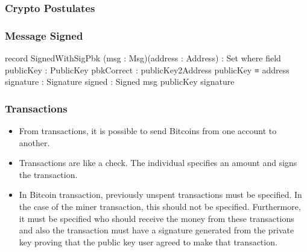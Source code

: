 \documentclass{beamer}
\begin{document}
\begin{frame}
  \frametitle{Crypto Postulates}
\end{frame}

\begin{frame}
  \frametitle{Message Signed}
\begin{code}
    record SignedWithSigPbk (msg : Msg)(address : Address)
      : Set where
      field
        publicKey   :  PublicKey
        pbkCorrect  :  publicKey2Address publicKey ≡ address
        signature   :  Signature
        signed      :  Signed msg publicKey signature

\end{code}
\end{frame}

\begin{frame}
   \frametitle{Transactions}
   \begin{itemize}
     \item From transactions, it is possible to send Bitcoins from one account to another.
     \item Transactions are like a check. The individual specifies an amount and signs the transaction.
     \item In Bitcoin transaction, previously unspent transactions must be specified.
       In the case of the miner transaction, this should not be specified.
       Furthermore, it must be specified who should receive the money from these transactions and
       also the transaction must have a signature generated from the private key proving
       that the public key user agreed to make that transaction.
   \end{itemize}
\end{frame}
\end{document}
